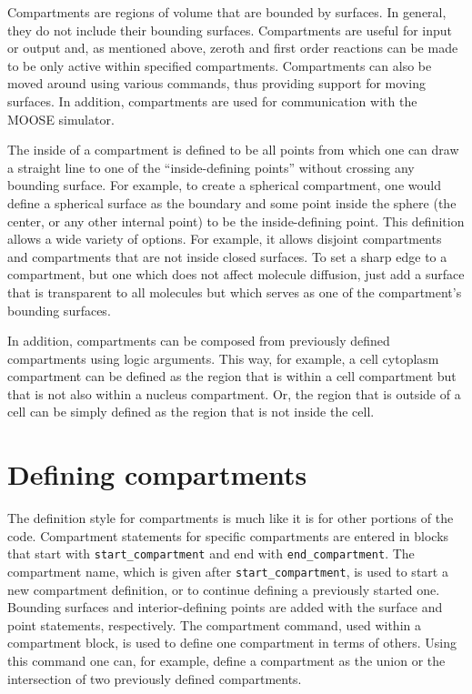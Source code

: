 \documentclass {book}
\newcommand {\ttt} {\texttt}
\begin{document}
Compartments are regions of volume that are bounded by surfaces. In general, they do not include their bounding surfaces. Compartments are useful for input or output and, as mentioned above, zeroth and first order reactions can be made to be only active within specified compartments. Compartments can also be moved around using various commands, thus providing support for moving surfaces. In addition, compartments are used for communication with the MOOSE simulator.

The inside of a compartment is defined to be all points from which one can draw a straight line to one of the ``inside-defining points'' without crossing any bounding surface. For example, to create a spherical compartment, one would define a spherical surface as the boundary and some point inside the sphere (the center, or any other internal point) to be the inside-defining point. This definition allows a wide variety of options. For example, it allows disjoint compartments and compartments that are not inside closed surfaces. To set a sharp edge to a compartment, but one which does not affect molecule diffusion, just add a surface that is transparent to all molecules but which serves as one of the compartment's bounding surfaces.

In addition, compartments can be composed from previously defined compartments using logic arguments. This way, for example, a cell cytoplasm compartment can be defined as the region that is within a cell compartment but that is not also within a nucleus compartment. Or, the region that is outside of a cell can be simply defined as the region that is not inside the cell.

\section{Defining compartments}

The definition style for compartments is much like it is for other portions of the code. Compartment statements for specific compartments are entered in blocks that start with \ttt{start\_compartment} and end with \ttt{end\_compartment}. The compartment name, which is given after \ttt{start\_compartment}, is used to start a new compartment definition, or to continue defining a previously started one. Bounding surfaces and interior-defining points are added with the surface and point statements, respectively. The compartment command, used within a compartment block, is used to define one compartment in terms of others. Using this command one can, for example, define a compartment as the union or the intersection of two previously defined compartments.
\end{document}
